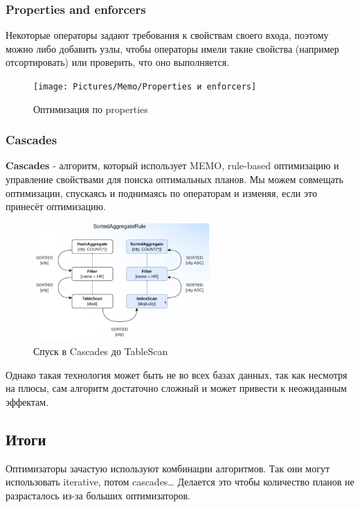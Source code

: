\documentclass[11pt]{article}
\begin{document}
    \newpage

    \subsubsection*{Properties and enforcers}

    Некоторые операторы задают требования к свойствам своего входа, поэтому можно либо добавить узлы, чтобы операторы имели такие свойства (например отсортировать) или проверить, что оно выполняется.

    \begin{figure}[h!]
        \centering
        \texttt{[image: Pictures/Memo/Properties и enforcers]}
        \caption{Оптимизация по properties}
        \label{fig:properties_enforcers}
    \end{figure}
    
    \newpage
    
    \subsubsection{Cascades}
    
    \textbf{Cascades} - алгоритм, который использует MEMO, rule-based оптимизацию и управление свойствами для поиска оптимальных планов.
    Мы можем совмещать оптимизации, спускаясь и поднимаясь по операторам и изменяя, если это принесёт оптимизацию.

    \begin{figure}[h!]
        \centering
        \includegraphics[width=0.6\textwidth]{Pictures/Cascades}
        \caption{Спуск в Cascades до TableScan}
        \label{fig:cascades}
    \end{figure}

    Однако такая технология может быть не во всех базах данных, так как несмотря на плюсы, сам алгоритм достаточно сложный и может привести к неожиданным эффектам.

    \subsection*{Итоги}

    Оптимизаторы зачастую используют комбинации алгоритмов.
    Так они могут использовать iterative, потом cascades\ldots
    Делается это чтобы количество планов не разрасталось из-за больших оптимизаторов.
\end{document}
